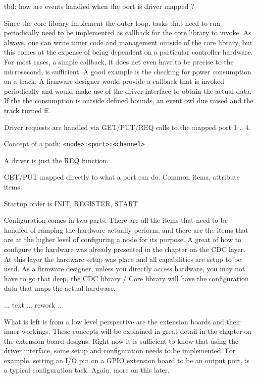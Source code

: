 tbd: how are events handled when the port is driver mapped ?


Since the core library implement the outer loop, tasks that need to run periodically need to be implemented as callback for the core library to invoke. As always, one can write timer code and management outside of the core library, but this comes at the expense of being dependent on a particular controller hardware. For most cases, a simple callback, it does net even have to be precise to the microsecond, is sufficient. A good example is the checking for power consumption on a track. A firmware designer would provide a callback that is invoked periodically and would make use of the driver interface to obtain the actual data. If the the consumption is outside defined bounds, an event owl  due raised and the track turned ff. 


Driver requests are handled via GET/PUT/REQ calls to the mapped port 1 .. 4.

Concept of a path: \texttt{<node>:<port>:<channel>}

A driver is just the REQ function. 

GET/PUT mapped directly to what a port can do. Common items, attribute items. 

Startup order is INIT, REGISTER, START 




Configuration comes in two parts. There are all the items that need to be handled of ramping the hardware actually perform, and there are the items that are at the higher level of configuring a node for its purpose. A great of how to configure the hardware was already presented in the chapter on the CDC layer. At this layer the hardware setup was place and all capabilities are setup to be used. As a firmware designer, unless you directly access hardware, you may not have to go that deep, the CDC library / Core library will have the configuration data that maps the actual hardware. 

... text ... rework ...

What is left is from a low level perspective are the extension boards and their inner workings. These concepts will be explained in great detail in the chapter on the extension board designs. Right now it is sufficient to know that using the driver interface, some setup and configuration needs to be implemented. For example, setting an I/O pin on a GPIO extension board to be an output port, is a typical configuration task. Again, more on this later.

